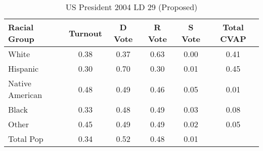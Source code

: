 \begin{table}[htb]
\begin{center}
\caption{US President 2004 LD 29 (Proposed)}
\label{pres04_cvap_ld_29}
\begin{tabular}{lccccc}
  \hline
Racial Group & Turnout & D Vote & R Vote & S Vote & Total CVAP \\ 
  \hline
White & 0.38 & 0.37 & 0.63 & 0.00 & 0.41 \\ 
  Hispanic & 0.30 & 0.70 & 0.30 & 0.01 & 0.45 \\ 
  Native American & 0.48 & 0.49 & 0.46 & 0.05 & 0.01 \\ 
  Black & 0.33 & 0.48 & 0.49 & 0.03 & 0.08 \\ 
  Other & 0.45 & 0.49 & 0.49 & 0.02 & 0.05 \\ 
  Total Pop & 0.34 & 0.52 & 0.48 & 0.01 &  \\ 
   \hline
\end{tabular}
\end{center}
\end{table}
